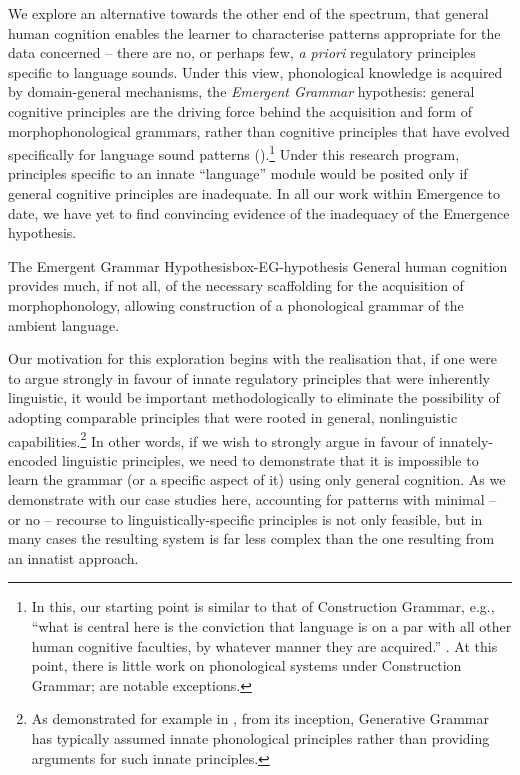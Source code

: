 We explore an alternative towards the other end of the spectrum, that general human cognition enables the learner to characterise patterns appropriate for the data concerned -- there are no, or perhaps few, {\it a priori} regulatory principles specific to language sounds. Under this view, phonological knowledge is acquired by domain-general mechanisms, the \textit{Emergent Grammar} hypothesis: general cognitive principles are the driving force behind the acquisition and form of morphophonological grammars, rather than cognitive principles that have evolved specifically for language sound patterns (\citealt{Lindblom:1999}).\footnote{In this, our starting point is similar to that of Construction Grammar, e.g., ``what is central here is the conviction that language is on a par with all other human cognitive faculties, by whatever manner they are acquired.'' \citet[1]{Valimaa-Blum:2011}. At this point, there is little work on phonological systems under Construction Grammar; \citet{Valimaa-Blum:2011, Hoder:2014, VanDerSpuy:2017} are notable exceptions.}  Under this research program, principles specific to an innate ``language'' module would be posited only if general cognitive principles are inadequate. In all our work within Emergence to date, we have yet to find convincing evidence of the inadequacy of the Emergence hypothesis.  


\begin{dadpbox}{The Emergent Grammar Hypothesis}{box-EG-hypothesis}
General human cognition provides much, if not all, of the necessary scaffolding for the acquisition of {morphophonology}, allowing construction of a phonological grammar of the ambient language.
\end{dadpbox}

Our motivation for this exploration begins with the realisation that, if one were to argue strongly in favour of innate regulatory principles that were inherently linguistic, it would be important methodologically to eliminate the possibility of adopting comparable principles that were rooted in general, nonlinguistic capabilities.\footnote{As demonstrated for example in \citet{Mielke:2008}, from its inception, Generative Grammar has typically assumed innate phonological principles rather than providing arguments for such innate principles.} In other words, if we wish to strongly argue in favour of innately-encoded linguistic principles, we need to demonstrate that it is impossible to learn the grammar (or a specific aspect of it) using only general cognition.  As we demonstrate with our case studies here,  accounting for patterns with {minimal -- or no --} recourse to linguistically-specific principles is not only feasible, but in many cases the resulting system is far less complex than the one resulting from  an innatist approach.

